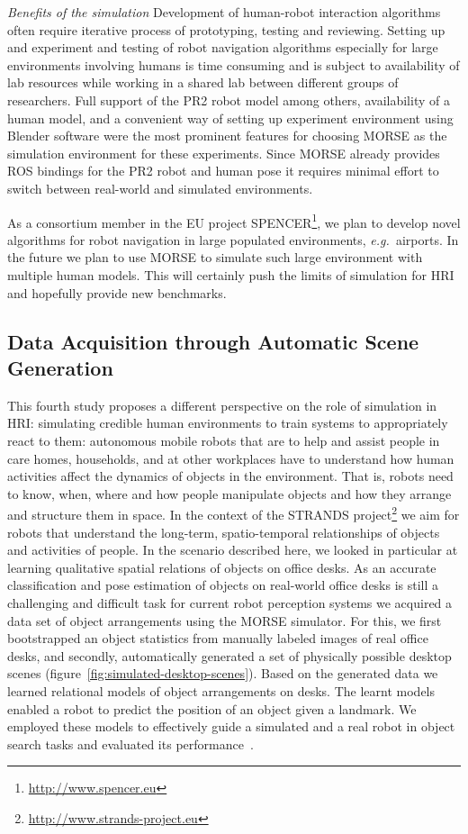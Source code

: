 \documentclass{llncs}
\newcommand{\eg}{{\textit{e.g.~}}}
\begin{document}
\emph{Benefits of the simulation} Development of human-robot interaction
algorithms often require iterative process of prototyping, testing and
reviewing. Setting up and experiment and testing of robot navigation algorithms
especially for large environments involving humans is time consuming and is
subject to availability of lab resources while working in a shared lab between
different groups of researchers. Full support of the PR2 robot model among
others, availability of a human model, and a convenient way of setting up
experiment environment using Blender software were the most prominent features
for choosing MORSE as the simulation environment for these experiments. Since
MORSE already provides ROS bindings for the PR2 robot and human pose it requires
minimal effort to switch between real-world and simulated environments.

As a consortium member in the EU project
SPENCER\footnote{\url{http://www.spencer.eu}}, we plan to develop novel
algorithms for robot navigation in large populated environments, \eg airports.
In the future we plan to use MORSE to simulate such large environment with
multiple human models. This will certainly push the limits of simulation for HRI
and hopefully provide new benchmarks.

\subsection{Data Acquisition through Automatic Scene Generation}
\label{sc:generation}

This fourth study proposes a different perspective on the role of simulation in
HRI: simulating credible human environments to train systems to appropriately
react to them: autonomous mobile robots that are to help and assist people in
care homes, households, and at other workplaces have to understand how human
activities affect the dynamics of objects in the environment. That is, robots
need to know, when, where and how people manipulate objects and how they arrange
and structure them in space. In the context of the STRANDS
project\footnote{\url{http://www.strands-project.eu}} we aim for robots that
understand the long-term, spatio-temporal relationships of objects and
activities of people. In the scenario described here, we looked in
particular at learning qualitative spatial relations of objects on office desks.
As an accurate classification and pose estimation of objects on real-world
office desks is still a challenging and difficult task for current robot
perception systems we acquired a data set of object arrangements using the MORSE
simulator. For this, we first bootstrapped an object statistics from manually
labeled images of real office desks, and secondly, automatically generated a set
of physically possible desktop scenes
(figure~\ref{fig:simulated-desktop-scenes}). Based on the generated data we
learned relational models of object arrangements on desks. The learnt models
enabled a robot to predict the position of an object given a landmark. We
employed these models to effectively guide a simulated and a real robot in
object search tasks and evaluated its performance~\cite{kunze14indirect}.
\end{document}
